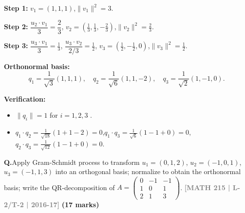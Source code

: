 \documentclass[12pt,a3paper]{article}
\newcommand{\yr}[1]{\hfill\textcolor{gray}{\small\textbf{[#1]}}}
\newcommand{\mk}[1]{\textcolor{orange!70!black}{\small\textbf{(#1 marks)}}}
\newcounter{qnum}
\newcommand{\Q}[1]{%
  \needspace{4\baselineskip}
  \refstepcounter{qnum}
  \vspace{6pt}
  \noindent\textbf{Q\theqnum.}\enspace #1\par
}
\begin{document}
\begin{tcolorbox}[enhanced,breakable,
  colback=cD!4,colframe=cD,boxrule=0.8pt,arc=5pt,
  title={\textbf{Answer --- Gram-Schmidt $u_1=(1,1,1)$, $u_2=(1,1,0)$, $u_3=(1,0,0)$; Verify Orthonormality}},
  fonttitle=\bfseries\color{white},colbacktitle=cD]

\textbf{Step 1:} $v_1=(1,1,1)$,\quad $\|v_1\|^2=3$.

\textbf{Step 2:} $\dfrac{u_2\cdot v_1}{3}=\dfrac{2}{3}$,\quad
$v_2=\left(\tfrac{1}{3},\tfrac{1}{3},-\tfrac{2}{3}\right)$,\quad $\|v_2\|^2=\tfrac{2}{3}$.

\textbf{Step 3:} $\dfrac{u_3\cdot v_1}{3}=\tfrac{1}{3}$,\;
$\dfrac{u_3\cdot v_2}{2/3}=\tfrac{1}{2}$,\quad
$v_3=\left(\tfrac{1}{2},-\tfrac{1}{2},0\right)$,\quad $\|v_3\|^2=\tfrac{1}{2}$.

\textbf{Orthonormal basis:}
\[
q_1=\frac{1}{\sqrt{3}}(1,1,1),\quad
q_2=\frac{1}{\sqrt{6}}(1,1,-2),\quad
q_3=\frac{1}{\sqrt{2}}(1,-1,0).
\]

\textbf{Verification:}
\begin{itemize}[itemsep=2pt]
  \item $\|q_i\|=1$ for $i=1,2,3$ . \checkmark
  \item $q_1\cdot q_2=\tfrac{1}{\sqrt{18}}(1+1-2)=0$,\quad $q_1\cdot q_3=\tfrac{1}{\sqrt{6}}(1-1+0)=0$,\quad $q_2\cdot q_3=\tfrac{1}{\sqrt{12}}(1-1+0)=0$. \checkmark
\end{itemize}

\end{tcolorbox}


\Q{Apply Gram-Schmidt process to transform $u_1 = (0,1,2)$, $u_2 = (-1,0,1)$, $u_3 = (-1,1,3)$ into an orthogonal basis; normalize to obtain the orthonormal basis; write the QR-decomposition of $A = \begin{pmatrix} 0 & -1 & -1 \\ 1 & 0 & 1 \\ 2 & 1 & 3 \end{pmatrix}$.
\yr{MATH 215 | L-2/T-2 | 2016-17} \mk{17}}
\end{document}
